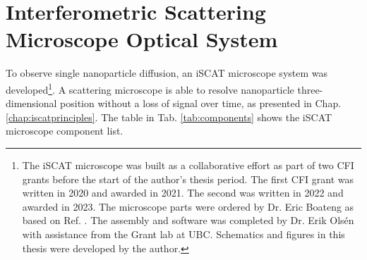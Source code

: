 \chapter{Interferometric Scattering Microscope Optical System}
\label{chap:iscatsetup}

To observe single nanoparticle diffusion, an iSCAT microscope system was developed\footnote{The iSCAT microscope was built as a collaborative effort as part of two CFI grants before the start of the author's thesis period. The first CFI grant was written in 2020 and awarded in 2021. The second was written in 2022 and awarded in 2023. The microscope parts were ordered by Dr. Eric Boateng as based on Ref. \cite{young_interferometric_2019, ortega-arroyoInterferometricScatteringMicroscopy2012, OrtegaArroyo2016}. The assembly and software was completed by Dr. Erik Olsén with assistance from the Grant lab at UBC. Schematics and figures in this thesis were developed by the author.}. A scattering microscope is able to resolve nanoparticle three-dimensional position without a loss of signal over time, as presented in Chap. \ref{chap:iscatprinciples}. The table in Tab. \ref{tab:components} shows the iSCAT microscope component list.

